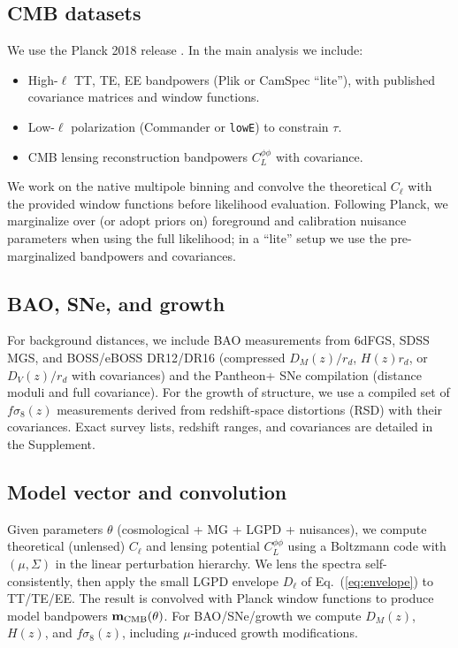 \label{sec:data}

\subsection{CMB datasets}
We use the Planck 2018 release \cite{Planck2018_params,Planck2018_lensing}. In the main analysis we include:
\begin{itemize}
  \item High-$\ell$ TT, TE, EE bandpowers (Plik or CamSpec ``lite''), with published covariance matrices and window functions.
  \item Low-$\ell$ polarization (Commander or \texttt{lowE}) to constrain $\tau$.
  \item CMB lensing reconstruction bandpowers $C_L^{\phi\phi}$ with covariance.
\end{itemize}
We work on the native multipole binning and convolve the theoretical $C_\ell$ with the provided window functions before likelihood evaluation. Following Planck, we marginalize over (or adopt priors on) foreground and calibration nuisance parameters when using the full likelihood; in a ``lite'' setup we use the pre-marginalized bandpowers and covariances.

\subsection{BAO, SNe, and growth}
For background distances, we include BAO measurements from 6dFGS, SDSS MGS, and BOSS/eBOSS DR12/DR16 \cite{Alam2017_BOSS,Gil-Marin2020_eBOSS} (compressed $D_M(z)/r_d$, $H(z)r_d$, or $D_V(z)/r_d$ with covariances) and the Pantheon+ SNe compilation \cite{Scolnic2018_Pantheon} (distance moduli and full covariance). For the growth of structure, we use a compiled set of $f\sigma_8(z)$ measurements derived from redshift-space distortions (RSD) with their covariances. Exact survey lists, redshift ranges, and covariances are detailed in the Supplement.

\subsection{Model vector and convolution}
Given parameters $\theta$ (cosmological + MG + LGPD + nuisances), we compute theoretical (unlensed) $C_\ell$ and lensing potential $C_L^{\phi\phi}$ using a Boltzmann code with $(\mu,\Sigma)$ in the linear perturbation hierarchy. We lens the spectra self-consistently, then apply the small LGPD envelope $D_\ell$ of Eq.~(\ref{eq:envelope}) to TT/TE/EE. The result is convolved with Planck window functions to produce model bandpowers $\mathbf{m}_{\rm CMB}(\theta)$. For BAO/SNe/growth we compute $D_M(z)$, $H(z)$, and $f\sigma_8(z)$, including $\mu$-induced growth modifications.

